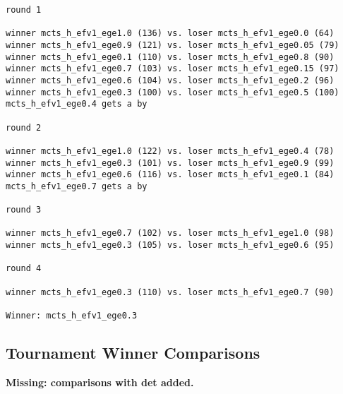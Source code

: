 \documentclass{article}
\begin{document}
\begin{verbatim}
round 1

winner mcts_h_efv1_ege1.0 (136) vs. loser mcts_h_efv1_ege0.0 (64)
winner mcts_h_efv1_ege0.9 (121) vs. loser mcts_h_efv1_ege0.05 (79)
winner mcts_h_efv1_ege0.1 (110) vs. loser mcts_h_efv1_ege0.8 (90)
winner mcts_h_efv1_ege0.7 (103) vs. loser mcts_h_efv1_ege0.15 (97)
winner mcts_h_efv1_ege0.6 (104) vs. loser mcts_h_efv1_ege0.2 (96)
winner mcts_h_efv1_ege0.3 (100) vs. loser mcts_h_efv1_ege0.5 (100)
mcts_h_efv1_ege0.4 gets a by

round 2

winner mcts_h_efv1_ege1.0 (122) vs. loser mcts_h_efv1_ege0.4 (78)
winner mcts_h_efv1_ege0.3 (101) vs. loser mcts_h_efv1_ege0.9 (99)
winner mcts_h_efv1_ege0.6 (116) vs. loser mcts_h_efv1_ege0.1 (84)
mcts_h_efv1_ege0.7 gets a by

round 3

winner mcts_h_efv1_ege0.7 (102) vs. loser mcts_h_efv1_ege1.0 (98)
winner mcts_h_efv1_ege0.3 (105) vs. loser mcts_h_efv1_ege0.6 (95)

round 4

winner mcts_h_efv1_ege0.3 (110) vs. loser mcts_h_efv1_ege0.7 (90)

Winner: mcts_h_efv1_ege0.3
\end{verbatim}

\subsection{Tournament Winner Comparisons}


{\bf {\color{red} Missing: comparisons with det added.}}
\end{document}

